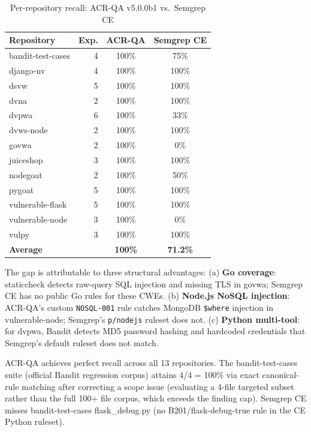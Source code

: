 \documentclass[conference]{IEEEtran}
\begin{document}
\begin{table}[t]
\centering
\caption{Per-repository recall: ACR-QA v5.0.0b1 vs.\ Semgrep CE}
\label{tab:recall}
\begin{tabular}{lrcc}
\toprule
Repository & Exp. & ACR-QA & Semgrep CE \\
\midrule
bandit-test-cases  & 4 & 100\% & 75\% \\
django-nv          & 4 & 100\% & 100\% \\
dsvw               & 5 & 100\% & 100\% \\
dvna               & 2 & 100\% & 100\% \\
dvpwa              & 6 & 100\% & 33\% \\
dvws-node          & 2 & 100\% & 100\% \\
govwa              & 2 & 100\% & 0\% \\
juiceshop          & 3 & 100\% & 100\% \\
nodegoat           & 2 & 100\% & 50\% \\
pygoat             & 5 & 100\% & 100\% \\
vulnerable-flask   & 5 & 100\% & 100\% \\
vulnerable-node    & 3 & 100\% & 0\% \\
vulpy               & 3 & 100\% & 100\% \\
\midrule
\textbf{Average}   & & \textbf{100\%} & \textbf{71.2\%} \\
\bottomrule
\end{tabular}
\end{table}

The gap is attributable to three structural advantages: (a) \textbf{Go coverage}: staticcheck detects raw-query SQL injection and missing TLS in govwa; Semgrep CE has no public Go rules for these CWEs. (b) \textbf{Node.js NoSQL injection}: ACR-QA's custom \texttt{NOSQL-001} rule catches MongoDB \texttt{\$where} injection in vulnerable-node; Semgrep's \texttt{p/nodejs} ruleset does not. (c) \textbf{Python multi-tool}: for dvpwa, Bandit detects MD5 password hashing and hardcoded credentials that Semgrep's default ruleset does not match.

ACR-QA achieves perfect recall across all 13 repositories. The bandit-test-cases suite (official Bandit regression corpus) attains 4/4 = 100\% via exact canonical-rule matching after correcting a scope issue (evaluating a 4-file targeted subset rather than the full 100+ file corpus, which exceeds the finding cap). Semgrep CE misses bandit-test-cases flask\_debug.py (no B201/flask-debug-true rule in the CE Python ruleset).
\end{document}
